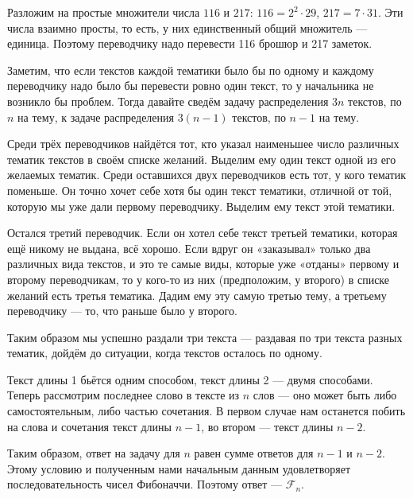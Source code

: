 \begin{itemize}

\itA Разложим на простые множители числа $116$ и $217$: $116 = 2^2 \cdot 29$, $217 = 7 \cdot 31$. Эти числа взаимно просты, то есть, у них единственный общий множитель — единица. Поэтому переводчику надо перевести 116 брошюр и 217 заметок.

\itB Заметим, что если текстов каждой тематики было бы по одному и каждому переводчику надо было бы перевести ровно один текст, то у начальника не возникло бы проблем. Тогда давайте сведём задачу распределения $3n$ текстов, по $n$ на тему, к задаче распределения $3(n-1)$ текстов, по $n-1$ на тему.

Среди трёх переводчиков найдётся тот, кто указал наименьшее число различных тематик текстов в своём списке желаний. Выделим ему один текст одной из его желаемых тематик. Среди оставшихся двух переводчиков есть тот, у кого тематик поменьше. Он точно хочет себе хотя бы один текст тематики, отличной от той, которую мы уже дали первому переводчику. Выделим ему текст этой тематики.

Остался третий переводчик. Если он хотел себе текст третьей тематики, которая ещё никому не выдана, всё хорошо. Если вдруг он «заказывал» только два различных вида текстов, и это те самые виды, которые уже «отданы» первому и второму переводчикам, то у кого-то из них (предположим, у второго) в списке желаний есть третья тематика. Дадим ему эту самую третью тему, а третьему переводчику — то, что раньше было у второго.

Таким образом мы успешно раздали три текста — раздавая по три текста разных тематик, дойдём до ситуации, когда текстов осталось по одному.

\itC Текст длины 1 бьётся одним способом, текст длины 2 — двумя способами. Теперь рассмотрим последнее слово в тексте из $n$ слов — оно может быть либо самостоятельным, либо частью сочетания. В первом случае нам останется побить на слова и сочетания текст длины $n-1$, во втором — текст длины $n-2$.

Таким образом, ответ на задачу для $n$ равен сумме ответов для $n-1$ и $n-2$. Этому условию и полученным нами начальным данным удовлетворяет последовательность чисел Фибоначчи. Поэтому ответ — $\mathcal{F}_n$.

\end{itemize}